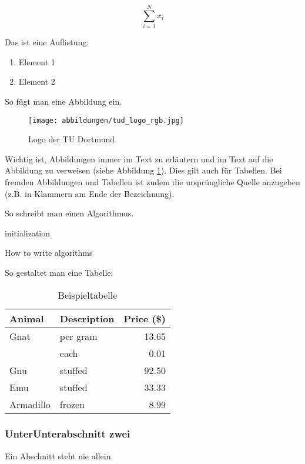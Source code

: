 \begin{equation}
    \sum_{i=1}^N x_i
    \label{eq:1}
\end{equation}

Das ist eine Auflistung:

\begin{enumerate}
\item Element 1
\item Element 2
\end{enumerate}

So fügt man eine Abbildung ein.

\begin{figure}[H]
    \centering
    \texttt{[image: abbildungen/tud\_logo\_rgb.jpg]}
    \caption{Logo der TU Dortmund}
    \label{fig:my_label}
\end{figure}

Wichtig ist, Abbildungen immer im Text zu erläutern und im Text auf die Abbildung zu verweisen (siehe Abbildung \ref{fig:my_label}). Dies gilt auch für Tabellen. Bei fremden Abbildungen und Tabellen ist zudem die ursprüngliche Quelle anzugeben (z.B. in Klammern am Ende der Bezeichnung).

So schreibt man einen Algorithmus.
\BlankLine
\begin{algorithm}[H]
 initialization\;
 \caption{How to write algorithms}
\end{algorithm}
\BlankLine
\BlankLine
So gestaltet man eine Tabelle:
\begin{table}[H]
\caption{Beispieltabelle}
\centering
\begin{tabular}{llr}
\hline
Animal    & Description & Price (\$) \\
\hline
Gnat      & per gram    & 13.65      \\
          & each        & 0.01       \\
Gnu       & stuffed     & 92.50      \\
Emu       & stuffed     & 33.33      \\
Armadillo & frozen      & 8.99       \\
\hline
\end{tabular}
\end{table}

\subsubsection{UnterUnterabschnitt zwei}

Ein Abschnitt steht nie allein.